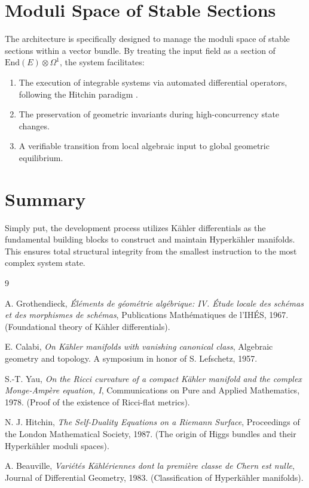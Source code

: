 \documentclass[10pt]{article}
\newcommand{\ka}{K\"{a}hler }
\newcommand{\hka}{Hyperk\"{a}hler }
\begin{document}
\section{Moduli Space of Stable Sections}
The architecture is specifically designed to manage the moduli space of stable sections within a vector bundle. By treating the input field as a section of $\text{End}(E) \otimes \Omega^1$, the system facilitates:
\begin{enumerate}
    \item The execution of integrable systems via automated differential operators, following the Hitchin paradigm \cite{Hitchin87}.
    \item The preservation of geometric invariants during high-concurrency state changes.
    \item A verifiable transition from local algebraic input to global geometric equilibrium.
\end{enumerate}

\section{Summary}
Simply put, the development process utilizes \ka differentials as the fundamental building blocks to construct and maintain \hka manifolds. This ensures total structural integrity from the smallest instruction to the most complex system state.

\begin{thebibliography}{9}

A. Grothendieck, \textit{\'{E}l\'{e}ments de g\'{e}om\'{e}trie alg\'{e}brique: IV. \'{E}tude locale des sch\'{e}mas et des morphismes de sch\'{e}mas}, Publications Math\'{e}matiques de l'IH\'{E}S, 1967. (Foundational theory of \ka differentials).

E. Calabi, \textit{On K\"{a}hler manifolds with vanishing canonical class}, Algebraic geometry and topology. A symposium in honor of S. Lefschetz, 1957.

S.-T. Yau, \textit{On the Ricci curvature of a compact K\"{a}hler manifold and the complex Monge-Amp\`{e}re equation, I}, Communications on Pure and Applied Mathematics, 1978. (Proof of the existence of Ricci-flat metrics).

N. J. Hitchin, \textit{The Self-Duality Equations on a Riemann Surface}, Proceedings of the London Mathematical Society, 1987. (The origin of Higgs bundles and their \hka moduli spaces).

A. Beauville, \textit{Vari\'{e}t\'{e}s K\"{a}hl\'{e}riennes dont la premi\`{e}re classe de Chern est nulle}, Journal of Differential Geometry, 1983. (Classification of \hka manifolds).

\end{thebibliography}
\end{document}
